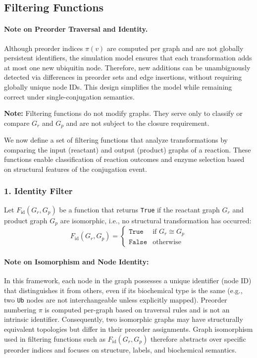 \documentclass[12pt]{article}
\begin{document}
\subsection{Filtering Functions}

\paragraph{Note on Preorder Traversal and Identity.}
Although preorder indices $\pi(v)$ are computed per graph and are not globally persistent identifiers, the simulation model ensures that each transformation adds at most one new ubiquitin node. Therefore, new additions can be unambiguously detected via differences in preorder sets and edge insertions, without requiring globally unique node IDs. This design simplifies the model while remaining correct under single-conjugation semantics.

\textbf{Note:} Filtering functions do not modify graphs. They serve only to classify or compare $G_r$ and $G_p$ and are not subject to the closure requirement.

We now define a set of filtering functions that analyze transformations by comparing the input (reactant) and output (product) graphs of a reaction. These functions enable classification of reaction outcomes and enzyme selection based on structural features of the conjugation event.

\subsubsection*{1. Identity Filter}

Let $F_{\text{id}}(G_r, G_p)$ be a function that returns \texttt{True} if the reactant graph $G_r$ and product graph $G_p$ are isomorphic, i.e., no structural transformation has occurred:
\[
F_{\text{id}}(G_r, G_p) =
\begin{cases}
\texttt{True} & \text{if } G_r \cong G_p \\
\texttt{False} & \text{otherwise}
\end{cases}
\]

\paragraph{Note on Isomorphism and Node Identity:} In this framework, each node in the graph possesses a unique identifier (node ID) that distinguishes it from others, even if its biochemical type is the same (e.g., two \texttt{Ub} nodes are not interchangeable unless explicitly mapped). Preorder numbering $\pi$ is computed per-graph based on traversal rules and is not an intrinsic identifier. Consequently, two isomorphic graphs may have structurally equivalent topologies but differ in their preorder assignments. Graph isomorphism used in filtering functions such as $F_{\text{id}}(G_r, G_p)$ therefore abstracts over specific preorder indices and focuses on structure, labels, and biochemical semantics.
\end{document}
